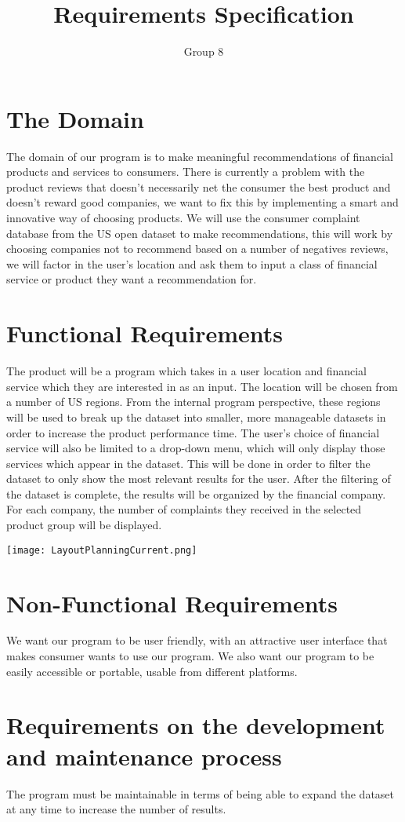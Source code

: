 \documentclass[12pt]{article}
\title{Requirements Specification}
\author{Group 8}
\begin{document}
\maketitle

\newpage

\section{The Domain}
The domain of our program is to make meaningful recommendations of financial products and services to consumers. There is currently a problem with the product reviews that doesn’t necessarily net the consumer the best product and doesn’t reward good companies, we want to fix this by implementing a smart and innovative way of choosing products. We will use the consumer complaint database from the US open dataset to make recommendations, this will work by choosing companies not to recommend based on a number of negatives reviews, we will factor in the user’s location and ask them to input a class of financial service or product they want a recommendation for.


\section{Functional Requirements}
The product will be a program which takes in a user location and financial service which they are interested in as an input. The location will be chosen from a number of US regions. From the internal program perspective, these regions will be used to break up the dataset into smaller, more manageable datasets in order to increase the product performance time. The user’s choice of financial service will also be limited to a drop-down menu, which will only display those services which appear in the dataset. This will be done in order to filter the dataset to only show the most relevant results for the user. After the filtering of the dataset is complete, the results will be organized by the financial company. For each company, the number of complaints they received in the selected product group will be displayed. 

\texttt{[image: LayoutPlanningCurrent.png]}


\section{Non-Functional Requirements}
We want our program to be user friendly, with an attractive user interface that makes consumer wants to use our program. We also want our program to be easily accessible or portable, usable from different platforms.

\section{Requirements on the development and maintenance process}
The program must be maintainable in terms of being able to expand the dataset at any time to increase the number of results.
\end{document}
